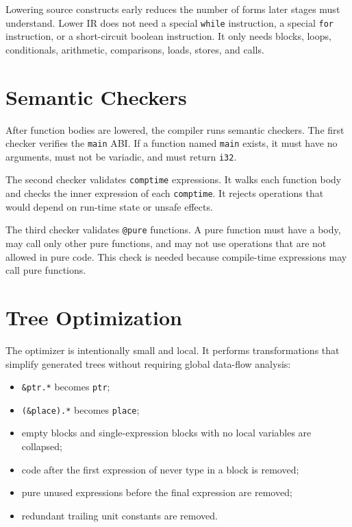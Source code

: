 Lowering source constructs early reduces the number of forms later stages must
understand. Lower IR does not need a special \texttt{while} instruction, a
special \texttt{for} instruction, or a short-circuit boolean instruction. It only
needs blocks, loops, conditionals, arithmetic, comparisons, loads, stores, and
calls.

\section{Semantic Checkers}

After function bodies are lowered, the compiler runs semantic checkers. The
first checker verifies the \texttt{main} ABI. If a function named \texttt{main}
exists, it must have no arguments, must not be variadic, and must return
\texttt{i32}.

The second checker validates \texttt{comptime} expressions. It walks each
function body and checks the inner expression of each \texttt{comptime}. It
rejects operations that would depend on run-time state or unsafe effects.

The third checker validates \texttt{@pure} functions. A pure function must have
a body, may call only other pure functions, and may not use operations that are
not allowed in pure code. This check is needed because compile-time expressions
may call pure functions.

\section{Tree Optimization}

The \irtree{} optimizer is intentionally small and local. It performs
transformations that simplify generated trees without requiring global data-flow
analysis:

\begin{itemize}
  \item \texttt{\&ptr.*} becomes \texttt{ptr};
  \item \texttt{(\&place).*} becomes \texttt{place};
  \item empty blocks and single-expression blocks with no local variables are
        collapsed;
  \item code after the first expression of never type in a block is removed;
  \item pure unused expressions before the final expression are removed;
  \item redundant trailing unit constants are removed.
\end{itemize}


